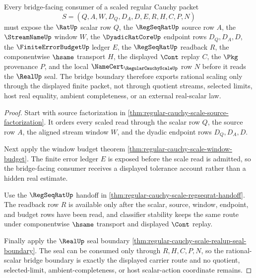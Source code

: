 \begin{theorem}
\label{thm:regular-cauchy-scale-rational-scalar-bridge-boundary}
Every bridge-facing consumer of a scaled regular Cauchy packet
$$
S=(Q,A,W,D_Q,D_A,D,E,R,H,C,P,N)
$$
must expose the $\RatUp$ scalar row $Q$, the $\RegSeqRatUp$ source row $A$, the $\StreamNameUp$ window $W$, the $\DyadicRatCoreUp$ endpoint rows $D_Q,D_A,D$, the $\FiniteErrorBudgetUp$ ledger $E$, the $\RegSeqRatUp$ readback $R$, the componentwise $\hsame$ transport $H$, the displayed $\Cont$ replay $C$, the $\Pkg$ provenance $P$, and the local $\NameCert_{\RegularCauchyScaleUp}$ row $N$ before it reads the $\RealUp$ seal. The bridge boundary therefore exports rational scaling only through the displayed finite packet, not through quotient streams, selected limits, host real equality, ambient completeness, or an external real-scalar law.
\end{theorem}
\begin{proof}
Start with source factorization in \autoref{thm:regular-cauchy-scale-source-factorization}. It orders every scaled read through the scalar row $Q$, the source row $A$, the aligned stream window $W$, and the dyadic endpoint rows $D_Q,D_A,D$.

Next apply the window budget theorem \autoref{thm:regular-cauchy-scale-window-budget}. The finite error ledger $E$ is exposed before the scale read is admitted, so the bridge-facing consumer receives a displayed tolerance account rather than a hidden real estimate.

Use the $\RegSeqRatUp$ handoff in \autoref{thm:regular-cauchy-scale-regseqrat-handoff}. The readback row $R$ is available only after the scalar, source, window, endpoint, and budget rows have been read, and classifier stability keeps the same route under componentwise $\hsame$ transport and displayed $\Cont$ replay.

Finally apply the $\RealUp$ seal boundary \autoref{thm:regular-cauchy-scale-realup-seal-boundary}. The seal can be consumed only through $R,H,C,P,N$, so the rational-scalar bridge boundary is exactly the displayed carrier route and no quotient, selected-limit, ambient-completeness, or host scalar-action coordinate remains.
\end{proof}

